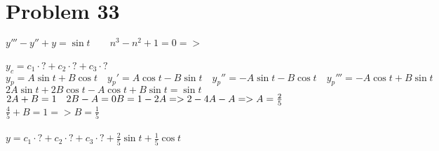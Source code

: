 \documentclass[12pt]{exam}
\begin{document}
\section*{Problem 33}
$y'''-y''+y=\sin{t}\qquad n^3-n^2+1=0=>$\\\\
$y_c=c_1\cdot?+c_2\cdot?+c_3\cdot?$\\
$y_p=A\sin{t}+B\cos{t}\quad y_p'=A\cos{t}-B\sin{t}\quad y_p''=-A\sin{t}-B\cos{t}\quad y_p'''=-A\cos{t}+B\sin{t}$\\
$2A\sin{t}+2B\cos{t}-A\cos{t}+B\sin{t}=\sin{t}$\\
$2A+B=1\quad2B-A=0\\B=1-2A=>2-4A-A=>A=\frac{2}{5}$\\
$\frac{4}{5}+B=1=>B=\frac{1}{5}$\\\\
$y=c_1\cdot?+c_2\cdot?+c_3\cdot?+\frac{2}{5}\sin{t}+\frac{1}{5}\cos{t}$
\end{document}
